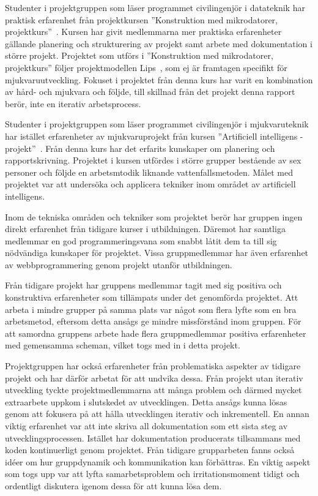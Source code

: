 Studenter i projektgruppen som läser programmet civilingenjör i datateknik har praktisk erfarenhet från projektkursen ''Konstruktion med mikrodatorer, projektkurs''~\cite{tsea29}. Kursen har givit medlemmarna mer praktiska erfarenheter gällande planering och strukturering av projekt samt arbete med dokumentation i större projekt. Projektet som utförs i ''Konstruktion med mikrodatorer, projektkurs'' följer projektmodellen Lips~\cite{lips}, som ej är framtagen specifikt för mjukvaruutveckling. Fokuset i projektet från denna kurs har varit en kombination av hård- och mjukvara och följde, till skillnad från det projekt denna rapport berör, inte en iterativ arbetsprocess.

Studenter i projektgruppen som läser programmet civilingenjör i mjukvaruteknik har istället erfarenheter av mjukvaruprojekt från kursen ''Artificiell intelligens - projekt''~\cite{tddd92}. Från denna kurs har det erfarits kunskaper om planering och rapportskrivning. Projektet i kursen utfördes i större grupper bestående av sex personer och följde en arbetsmtodik liknande vattenfallsmetoden. Målet med projektet var att undersöka och applicera tekniker inom området av artificiell intelligens.

Inom de tekniska områden och tekniker som projektet berör har gruppen ingen direkt erfarenhet från tidigare kurser i utbildningen. Däremot har samtliga medlemmar en god programmeringsvana som snabbt låtit dem ta till sig nödvändiga kunskaper för projektet. Vissa gruppmedlemmar har även erfarenhet av webbprogrammering genom projekt utanför utbildningen.

Från tidigare projekt har gruppens medlemmar tagit med sig positiva och konstruktiva erfarenheter som tillämpats under det genomförda projektet. Att arbeta i mindre grupper på samma plats var något som flera lyfte som en bra arbetsmetod, eftersom detta ansågs ge mindre missförstånd inom gruppen. För att samordna gruppens arbete hade flera gruppmedlemmar positiva erfarenheter med gemensamma scheman, vilket togs med in i detta projekt.

Projektgruppen har också erfarenheter från problematiska aspekter av tidigare projekt och har därför arbetat för att undvika dessa. Från projekt utan iterativ utveckling tyckte projektmedlemmarna att många problem och därmed mycket extraarbete uppkom i slutskedet av utvecklingen. Detta ansågs kunna lösas genom att fokusera på att hålla utvecklingen iterativ och inkrementell. En annan viktig erfarenhet var att inte skriva all dokumentation som ett sista steg av utvecklingsprocessen. Istället har dokumentation producerats tillsammans med koden kontinuerligt genom projektet. Från tidigare grupparbeten fanns också idéer om hur gruppdynamik och kommunikation kan förbättras. En viktig aspekt som togs upp var att lyfta samarbetsproblem och irritationsmoment tidigt och ordentligt diskutera igenom dessa för att kunna lösa dem.
